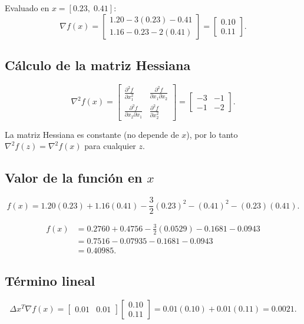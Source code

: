 \documentclass[12pt]{article}
\begin{document}
Evaluado en \(x = [0.23,\; 0.41]\):
\[
\nabla f(x) =
\begin{bmatrix}
1.20 - 3(0.23) - 0.41 \\
1.16 - 0.23 - 2(0.41)
\end{bmatrix}
=
\begin{bmatrix}
0.10 \\
0.11
\end{bmatrix}.
\]

\subsection{Cálculo de la matriz Hessiana}

\[
\nabla^2 f(x) =
\begin{bmatrix}
\frac{\partial^2 f}{\partial x_1^2} & \frac{\partial^2 f}{\partial x_1\partial x_2} \\[4pt]
\frac{\partial^2 f}{\partial x_2\partial x_1} & \frac{\partial^2 f}{\partial x_2^2}
\end{bmatrix}
=
\begin{bmatrix}
-3 & -1 \\
-1 & -2
\end{bmatrix}.
\]

La matriz Hessiana es constante (no depende de \(x\)), por lo tanto
\(\nabla^2 f(z) = \nabla^2 f(x)\) para cualquier \(z\).

\subsection{Valor de la función en \(x\)}

\[
f(x) = 1.20(0.23) + 1.16(0.41) - \frac{3}{2}(0.23)^2 - (0.41)^2 - (0.23)(0.41).
\]

\begin{align*}
f(x) &= 0.2760 + 0.4756 - \frac{3}{2}(0.0529) - 0.1681 - 0.0943 \\
     &= 0.7516 - 0.07935 - 0.1681 - 0.0943 \\
     &= 0.40985.
\end{align*}

\subsection{Término lineal}

\[
\Delta x^T \nabla f(x) =
\begin{bmatrix} 0.01 & 0.01 \end{bmatrix}
\begin{bmatrix} 0.10 \\ 0.11 \end{bmatrix}
= 0.01(0.10) + 0.01(0.11) = 0.0021.
\]
\end{document}
